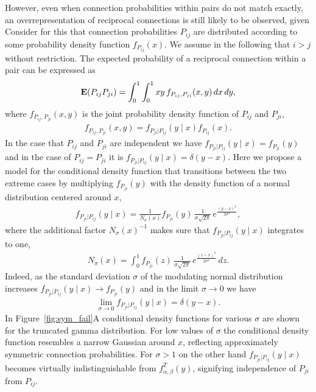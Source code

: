However, even when connection probabilities within pairs do not match exactly, an overrepresentation of reciprocal connections is still likely to be observed, given   Consider for this that connection probabilities $P_{ij}$ are distributed according to some probability density function $f_{P_{ij}}(x)$. We assume in the following that $i > j$ without restriction. The expected probability of a reciprocal connection within a pair can be expressed as
%
\begin{align}
  \operatorname{\mathbf{E}}(P_{ij}P_{ji}) = \int_0^1 \int_0^1 xy\, f_{P_{ij},P_{ji}}(x,y) \, dx\, dy, \label{eq:dbint}
\end{align}
%
where $f_{P_{ij},P_{ji}}(x,y)$ is the joint probability density function of $P_{ij}$ and $P_{ji}$, 
%
\begin{align}
  f_{P_{ij},P_{ji}}(x,y) =  f_{P_{ji} | P_{ij}}(y \mid x) f_{P_{ij}}(x). \label{eq:cdf_def}
\end{align}
%
In the case that $P_{ij}$ and $P_{ji}$ are independent we have $f_{P_{ji} | P_{ij}}(y \mid x) = f_{P_{ji}}(y)$ and in the case of $P_{ij}=P_{ji}$ it is $f_{P_{ji} | P_{ij}}(y \mid x) = \delta(y-x)$. Here we propose a model for the conditional density function that transitions between the two extreme cases by multiplying $f_{P_{ji}}(y)$ with the density function of a normal distribution centered around $x$,
%
\begin{align}
  f_{P_{ji} | P_{ij}} (y \mid x) = \frac{1}{N_{\sigma}(x)} f_{P_{ji}}(y)\, \frac{1}{\sigma \sqrt{2 \pi}} \,e^{\frac{(y-x)^2}{2 \sigma^2}} \label{eq:fpijpji},
\end{align}
%
where the additional factor $N_{\sigma}(x)^{-1}$  makes sure that $f_{P_{ji}|P_{ij}} (y \mid x)$ integrates to one,
%
\begin{align}
  N_{\sigma}(x) = \int_0^1 f_{P_{ji}}(z)\, \frac{1}{\sigma \sqrt{2 \pi}}\, e^{\frac{(z-x)^2}{2 \sigma^2}} \,dz.
\end{align}
%
Indeed, as the standard deviation $\sigma$ of the modulating normal distribution increases $f_{P_{ji}|P_{ij}} (y \mid x) \to f_{P_{ji}}(y)$ and in the limit $\sigma \to 0$ we have
\begin{align}
  \lim_{\sigma \to 0}   f_{P_{ji}|P_{ij}} (y \mid x) = \delta(y-x).
\end{align}
%
In Figure~\ref{fig:sym_fail}A  conditional density functions for various $\sigma$ are shown for the truncated gamma distribution. For low values of $\sigma$ the conditional density function resembles a narrow Gaussian around $x$, reflecting approximately symmetric connection probabilities. For $\sigma > 1$ on the other hand $f_{P_{ji} | P_{ij}}(y \mid x)$ becomes virtually indistinguishable from $f^T_{\alpha, \beta}(y)$, signifying independence of $P_{ji}$ from $P_{ij}$.


